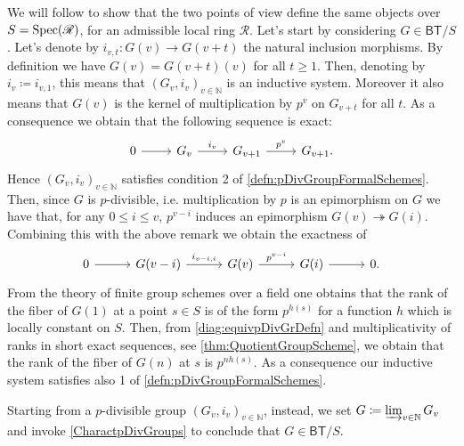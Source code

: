 \begin{rem}
	We will follow \cite[Chapter I, \S2, remark 2.3 and 
	Chapter II, \S2, theorem 2.1.7]{Messing} to show that
	the two points of view define the same objects over $S = \operatorname{Spec}(\mathscr{R})$,
	for an admissible local ring $\mathscr{R}$.
	Let's start by considering $G \in \mathsf{BT}/S$.
	Let's denote by $i_{v,t}\colon G(v) \to G(v+t)$ the natural inclusion
	morphisms.
	By definition we have $G(v) = G(v+t)(v)$ for all $t \geq 1$.
	Then, denoting by $i_v \coloneqq i_{v,1}$, this means that
	$\left( G_v, i_v \right)_{v \in \mathbb{N}}$ is an inductive system.
	Moreover it also means that $G(v)$ is the kernel of multiplication
	by $p^v$ on $G_{v+t}$ for all $t$. 
	As a consequence we obtain that the following sequence is exact:
	\begin{equation*}
	\begin{tikzcd}
		0 \arrow[r, "", rightarrow] &
		G_v \arrow[r, "i_v", rightarrow] &
		G_{v+1} \arrow[r, "p^v", rightarrow] &
		G_{v+1}
	.\end{tikzcd}
	\end{equation*}
	Hence $\left( G_v, i_v \right)_{v \in \mathbb{N}}$ satisfies condition 2
	of \cref{defn:pDivGroupFormalSchemes}.
	Then, since $G$ is $p$-divisible, i.e. multiplication by $p$ is an
	epimorphism on $G$ we have that, for any $0 \leq i \leq v$,
	$p^{v-i}$ induces an epimorphism $G(v) \twoheadrightarrow G(i)$.
	Combining this with the above remark we obtain the exactness of
	\begin{equation}\label{diag:equivpDivGrDefn}
	\begin{tikzcd}[column sep=2.9em]
		0 \arrow[r, "", rightarrow] &
		G(v-i) \arrow[r, "i_{v-i,i}", rightarrow] &
		G(v) \arrow[r, "p^{v-i}", rightarrow] &
		G(i) \arrow[r, "", rightarrow] &
		0
	.\end{tikzcd}
	\end{equation}
	From the theory of finite group schemes over a field one obtains that the
	rank of the fiber of $G(1)$ at a point $s \in S$ is of the form
	$p^{h(s)}$ for a function $h$ which is locally constant on $S$.
	Then, from \cref{diag:equivpDivGrDefn} and multiplicativity of
	ranks in short exact sequences, see \cref{thm:QuotientGroupScheme}, we obtain
	that the rank of the fiber of $G(n)$ at $s$
	is $p^{nh(s)}$.
	As a consequence our inductive system satisfies also 1
	of \cref{defn:pDivGroupFormalSchemes}.

	Starting from a $p$-divisible group $\left( G_v, i_v \right)_{v \in \mathbb{N}}$,
	instead, we set $G \coloneqq \varinjlim_{v \in \mathbb{N}} G_v$
	and invoke \cref{CharactpDivGroups} to conclude that $G \in \mathsf{BT}/S$.
\end{rem}

